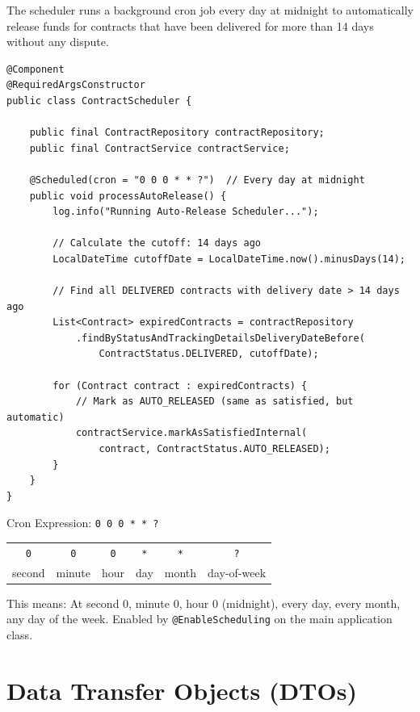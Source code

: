 \documentclass[11pt, a4paper]{article}
\begin{document}
The scheduler runs a background cron job every day at midnight to automatically release funds for contracts that have been delivered for more than 14 days without any dispute.

\begin{lstlisting}[caption={ContractScheduler.java}]
@Component
@RequiredArgsConstructor
public class ContractScheduler {

    public final ContractRepository contractRepository;
    public final ContractService contractService;

    @Scheduled(cron = "0 0 0 * * ?")  // Every day at midnight
    public void processAutoRelease() {
        log.info("Running Auto-Release Scheduler...");

        // Calculate the cutoff: 14 days ago
        LocalDateTime cutoffDate = LocalDateTime.now().minusDays(14);

        // Find all DELIVERED contracts with delivery date > 14 days ago
        List<Contract> expiredContracts = contractRepository
            .findByStatusAndTrackingDetailsDeliveryDateBefore(
                ContractStatus.DELIVERED, cutoffDate);

        for (Contract contract : expiredContracts) {
            // Mark as AUTO_RELEASED (same as satisfied, but automatic)
            contractService.markAsSatisfiedInternal(
                contract, ContractStatus.AUTO_RELEASED);
        }
    }
}
\end{lstlisting}

\begin{conceptbox}{Cron Expression: \texttt{0 0 0 * * ?}}
\begin{center}
\begin{tabular}{cccccc}
\texttt{0} & \texttt{0} & \texttt{0} & \texttt{*} & \texttt{*} & \texttt{?} \\
\small{second} & \small{minute} & \small{hour} & \small{day} & \small{month} & \small{day-of-week} \\
\end{tabular}
\end{center}
This means: At second 0, minute 0, hour 0 (midnight), every day, every month, any day of the week. Enabled by \texttt{@EnableScheduling} on the main application class.
\end{conceptbox}


\section{Data Transfer Objects (DTOs)}
\end{document}
